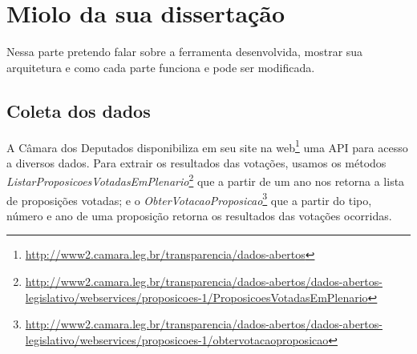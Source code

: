 \begin{knitrout}
\color{fgcolor}\begin{kframe}
\begin{alltt}
 \hlkwb{=} \hlstd{(}\hlstd{,} \hlstd{,} \hlstd{,} \hlstd{,} \hlstd{)}
 \hlkwb{=} \hlstd{()}
 \hlkwb{=} \hlstd{()}

   
   \hlkwb{=} \hlstd{(}\hlstd{(} \hlstd{,} \hlstd{=}\hlstd{),}
                                   \hlstd{=} \hlstd{,}  \hlstd{=} \hlstd{)}
   \hlkwb{=} \hlstd{(}\hlstd{(} \hlstd{,} \hlstd{=}\hlstd{),}
                                            \hlstd{=} \hlstd{,}  \hlstd{=} \hlstd{)}
\hlstd{\}}
\end{alltt}
\end{kframe}
\end{knitrout}

\chapter{Miolo da sua dissertação}\label{cap:miolo}

Nessa parte pretendo falar sobre a ferramenta desenvolvida, mostrar sua arquitetura e como cada parte funciona e pode ser modificada.

\section{Coleta dos dados}

A Câmara dos Deputados disponibiliza em seu site na
web\footnote{\url{http://www2.camara.leg.br/transparencia/dados-abertos}} uma
\gls{API} para acesso a diversos dados. Para extrair os resultados das
votações, usamos os métodos
\emph{ListarProposicoesVotadasEmPlenario}\footnote{\url{http://www2.camara.leg.br/transparencia/dados-abertos/dados-abertos-legislativo/webservices/proposicoes-1/ProposicoesVotadasEmPlenario}}
que a partir de um ano nos retorna a lista de proposições votadas; e o
\emph{ObterVotacaoProposicao}\footnote{\url{http://www2.camara.leg.br/transparencia/dados-abertos/dados-abertos-legislativo/webservices/proposicoes-1/obtervotacaoproposicao}}
que a partir do tipo, número e ano de uma proposição retorna os resultados das
votações ocorridas.  

